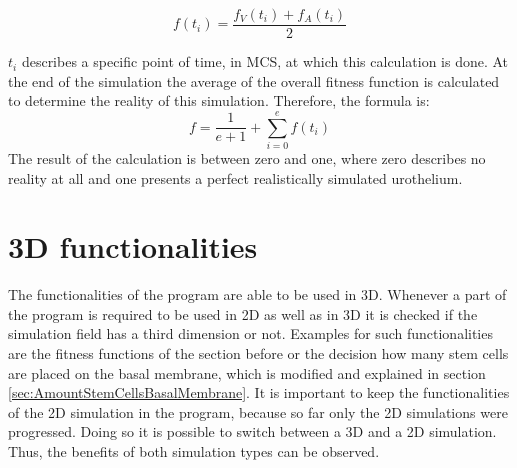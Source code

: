 \begin{equation} 
f(t_{i}) = \dfrac{f_{V}(t_{i})+f_{A}(t_{i})}{2}
\end{equation}

$t_{i}$ describes a specific point of time, in \ac{MCS}, at which this calculation is done. At the end of the simulation the average of the overall fitness function is calculated to determine the reality of this simulation. Therefore, the formula is:
\begin{equation} 
f = \dfrac{1}{e+1} + \sum_{i=0}^{e}{f(t_{i})}
\end{equation}
The result of the calculation is between zero and one, where zero describes no reality at all and one presents a perfect realistically simulated urothelium.


\section{3D functionalities }\label{sec:3D}
The functionalities of the program are able to be used in 3D. Whenever a part of the program is required to be used in 2D as well as in 3D it is checked if the simulation field has a third dimension or not. Examples for such functionalities are the fitness functions of the section before or the decision how many stem cells are placed on the basal membrane, which is modified and explained in section \ref{sec:AmountStemCellsBasalMembrane}. \newline
It is important to keep the functionalities of the 2D simulation in the program, because so far only the 2D simulations were progressed. Doing so it is possible to switch between a 3D and a 2D simulation. Thus, the benefits of both simulation types can be observed.












